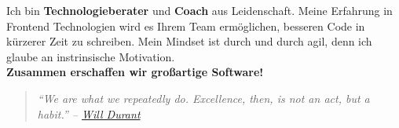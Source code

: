 \documentclass[9pt]{developercv} %
\newenvironment{itquote}
{\begin{quote}\itshape}
{\end{quote}}
\begin{document}

\begin{minipage}[t]{0.4\textwidth} %
	\vspace{-\baselineskip} %
  Ich bin \textbf{Technologieberater} und \textbf{Coach} aus Leidenschaft.
  Meine Erfahrung in Frontend Technologien wird es Ihrem Team ermöglichen, besseren Code in kürzerer Zeit zu schreiben.
  Mein Mindset ist durch und durch agil, denn ich glaube an instrinsische Motivation.\\
  \textbf{Zusammen erschaffen wir großartige Software!}
  \begin{itquote} 
    ``We are what we repeatedly do. Excellence, then, is not an act, but a habit.'' -- 
    \href{https://medium.com/the-mission/my-favourite-quote-of-all-time-is-a-misattribution-66356f22843d}{Will Durant}\\
  \end{itquote}
\end{minipage}
\hfill %
\begin{minipage}[t]{0.5\textwidth} %
	\vspace{-\baselineskip} %
	\begin{barchart}{5.5}
	\end{barchart}
  \vspace{0.4cm}
\end{minipage}

\begin{center}
\end{center}


\end{document}

